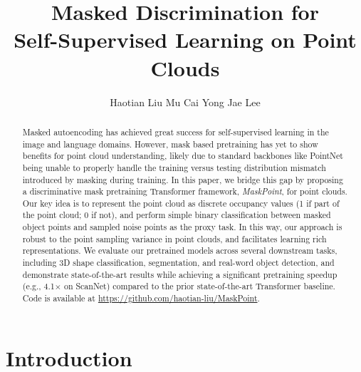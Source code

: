 \documentclass[runningheads]{llncs}
\begin{document}
\pagestyle{headings}
\mainmatter

\title{
Masked Discrimination for\\Self-Supervised Learning on Point Clouds
}

\def\methodname{MaskPoint}


\author{
Haotian Liu \quad
Mu Cai \quad
Yong Jae Lee
}



\maketitle


\begin{abstract}
Masked autoencoding has achieved great success for self-supervised learning in the image and language domains. However, mask based pretraining has yet to show benefits for point cloud understanding, likely due to standard backbones like PointNet being unable to properly handle the training versus testing distribution mismatch introduced by masking during training. In this paper, we bridge this gap by proposing a discriminative mask pretraining Transformer framework, \emph{\methodname{}}, for point clouds. Our key idea is to represent the point cloud as discrete occupancy values (1 if part of the point cloud; 0 if not), and perform simple binary classification between masked object points and sampled noise points as the proxy task. In this way, our approach is robust to the point sampling variance in point clouds, and facilitates learning rich representations. We evaluate our pretrained models across several downstream tasks, including 3D shape classification, segmentation, and real-word object detection, and demonstrate state-of-the-art results while achieving a significant pretraining speedup (e.g., 4.1$\times$ on ScanNet) compared to the prior state-of-the-art Transformer baseline. Code is available at \url{https://github.com/haotian-liu/MaskPoint}.
\end{abstract}

\section{Introduction}
\end{document}
